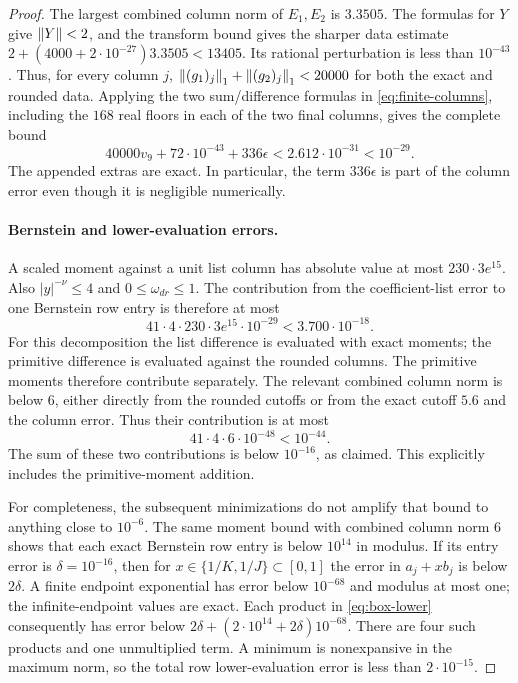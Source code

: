 \begin{proof}
The largest combined column norm of $E_1,E_2$ is $3.3505$.
The formulas for $Y$ give $\left\lVert Y\right\rVert<2$, and the transform bound gives
the sharper data estimate
$2+(4000+2\cdot10^{-27})3.3505<13405$.
Its rational perturbation is less than $10^{-43}$. Thus, for every column $j$,
$\left\lVert(g_1)_j\right\rVert_1+\left\lVert(g_2)_j\right\rVert_1<20000$ for both the exact and rounded data.
Applying the two sum/difference formulas in
\eqref{eq:finite-columns}, including the $168$ real floors in each of
the two final columns, gives the complete bound
\[
 40000v_9+72\cdot10^{-43}+336\epsilon
 <2.612\cdot10^{-31}<10^{-29}.
\]
The appended extras are exact.  In particular, the term $336\epsilon$ is
part of the column error even though it is negligible numerically.

\paragraph{Bernstein and lower-evaluation errors.}
A scaled moment against a unit list column has absolute value at most
$230\cdot3e^{15}$.  Also $|y|^{-\nu}\le4$ and
$0\le\omega_{dr}\le1$.  The contribution from the coefficient-list error
to one Bernstein row entry is therefore at most
\[
 41\cdot4\cdot230\cdot3e^{15}\cdot10^{-29}
 <3.700\cdot10^{-18}.
\]
For this decomposition the list difference is evaluated with exact moments;
the primitive difference is evaluated against the rounded columns.
The primitive moments therefore contribute separately.  The relevant combined
column norm is below $6$, either directly from the rounded cutoffs or
from the exact cutoff $5.6$ and the column error.  Thus their contribution
is at most
\[
 41\cdot4\cdot6\cdot10^{-48}<10^{-44}.
\]
The sum of these two contributions is below $10^{-16}$, as claimed.
This explicitly includes the primitive-moment addition.

For completeness, the subsequent minimizations do not amplify that bound
to anything close to $10^{-6}$.  The same moment bound with combined
column norm $6$ shows that each exact Bernstein row entry is below $10^{14}$
in modulus.  If its entry error is $\delta=10^{-16}$, then for
$x\in\{1/K,1/J\}\subset[0,1]$ the error in $a_j+xb_j$ is below $2\delta$.
A finite endpoint exponential has error below $10^{-68}$ and modulus at
most one; the infinite-endpoint values are exact.  Each product in
\eqref{eq:box-lower} consequently has error below
$2\delta+(2\cdot10^{14}+2\delta)10^{-68}$.  There are four such products
and one unmultiplied term.  A minimum is nonexpansive in the maximum norm,
so the total row lower-evaluation error is less than $2\cdot10^{-15}$.


\end{proof}
